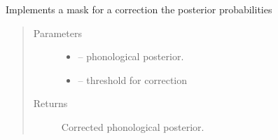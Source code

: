 \documentclass[letterpaper,10pt,english]{sphinxmanual}
\begin{document}
\begin{fulllineitems}
\begin{fulllineitems}
\begin{sphinxVerbatim}[commandchars=\\\{\}]
   
\PYG{p}{[}     \PYG{p}{]}
\end{sphinxVerbatim}

\end{fulllineitems}


\begin{fulllineitems}
\label{\detokenize{index:phonet.Phonet.mask_correction}}
Implements a mask for a correction the posterior probabilities
\begin{quote}\begin{description}
\item[{Parameters}] \leavevmode\begin{itemize}
\item {} 
 -- phonological posterior.

\item {} 
 -- threshold for correction

\end{itemize}

\item[{Returns}] \leavevmode
Corrected phonological posterior.

\end{description}\end{quote}

\end{fulllineitems}


\end{fulllineitems}
\end{document}

